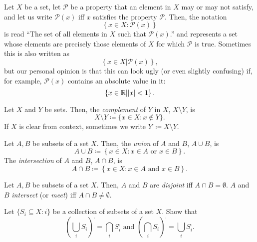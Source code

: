 \begin{displayquote}
Let $X$ be a set, let $\mathcal{P}$ be a property that an element in $X$ may or may not satisfy, and let us write $\mathcal{P}(x)$ iff $x$ satisfies the property $\mathcal{P}$.  Then, the notation
\begin{equation*}
\left\{ x\in X:\mathcal{P}(x)\right\}
\end{equation*}
is read ``The set of all elements in $X$ such that $\mathcal{P}(x)$.'' and represents a set whose elements are precisely those elements of $X$ for which $\mathcal{P}$ is true.  Sometimes this is also written as
\begin{equation*}
\left\{ x\in X|\mathcal{P}(x)\right\} ,
\end{equation*}
but our personal opinion is that this can look ugly (or even slightly confusing) if, for example, $\mathcal{P}(x)$ contains an absolute value in it:
\begin{equation*}
\left\{ x\in \mathbb{R} |\lvert x\rvert<1\right\} .
\end{equation*}
\end{displayquote}
\begin{dfn}[Complement]
Let $X$ and $Y$ be sets.  Then, the \emph{complement} of $Y$ in $X$, $X\setminus Y$, is
\begin{equation}
X\setminus Y\coloneqq \{ x\in X:x\notin Y\} .
\end{equation}
If $X$ is clear from context, sometimes we write $Y^{\comp}\coloneqq X\setminus Y$.
\end{dfn}
\begin{dfn}
Let $A,B$ be subsets of a set $X$.  Then, the \emph{union} of $A$ and $B$, $A\cup B$, is
\begin{equation}
A\cup B\coloneqq \left\{ x\in X:x\in A\text{ or }x\in B\right\} .
\end{equation}
The \emph{intersection} of $A$ and $B$, $A\cap B$, is
\begin{equation}
A\cap B\coloneqq \left\{ x\in X:x\in A\text{ and }x\in B\right\} .
\end{equation}
\end{dfn}
\begin{dfn}
Let $A,B$ be subsets of a set $X$.  Then, $A$ and $B$ are \emph{disjoint} iff $A\cap B=\emptyset$.  $A$ and $B$ \emph{intersect} (or \emph{meet}) iff $A\cap B\neq \emptyset$.
\end{dfn}
\begin{exr}\label{DeMorgansLaws}
Let $\{ S_i\subseteq X:i\}$ be a collection of subsets of a set $X$.  Show that
\begin{equation}
\left( \bigcup _iS_i\right) ^{\comp}=\bigcap _iS_i^{\comp}\text{ and }\left( \bigcap _iS_i\right) ^{\comp}=\bigcup _iS_i^{\comp}.
\end{equation}
\end{exr}

